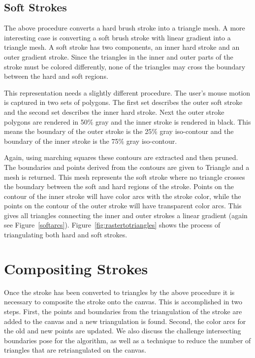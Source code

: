 \documentclass[review]{acmsiggraph}
\begin{document}

\subsection{Soft Strokes}
The above procedure converts a hard brush stroke into a triangle mesh. A more interesting
case is converting a soft brush stroke with linear gradient into a triangle mesh. A soft stroke has two
components, an inner hard stroke and an outer gradient stroke. Since the triangles in the inner and
outer parts of the stroke must be colored differently, none of the triangles may cross the boundary
between the hard and soft regions.

This representation needs a slightly different procedure. The user's mouse motion
is captured in two sets of polygons. The first set describes the outer soft stroke and the second set describes
the inner hard stroke. Next the outer stroke polygons are rendered in 50\% gray and the inner stroke
is rendered in black. This means the boundary of the outer stroke is the 25\% gray iso-contour and the
boundary of the inner stroke is the 75\% gray iso-contour.

Again, using marching squares these contours are extracted and then pruned. The boundaries and points
derived from the contours are given to Triangle and a mesh is returned. This mesh represents the soft
stroke where no triangle crosses the boundary between the soft and hard regions
of the stroke. Points on the contour of the inner stroke will have color arcs with the stroke color,
while the points on the contour of the outer stroke will have transparent color arcs. This gives
all triangles connecting the inner and outer strokes a linear gradient (again see Figure~\ref{softarcs}).
Figure~\ref{fig:rastertotriangles} shows the process of triangulating both hard and soft strokes.


\section{Compositing Strokes}
Once the stroke has been converted to triangles by the above procedure it is necessary to
composite the stroke onto the canvas. This is accomplished in two steps. First, the points
and boundaries from the triangulation of the stroke are added to the canvas and a new
triangulation is found. Second, the color arcs for the old and new points are updated.
We also discuss the challenge intersecting boundaries pose for the algorithm, as well
as a technique to reduce the number of triangles that are retriangulated on the canvas.
\end{document}
